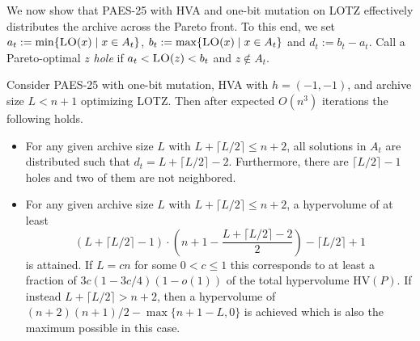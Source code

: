 \documentclass[
sigconf = false, %
review = false, %
screen = true, %
anonymous = true, %
format=acmsmall
]{acmart}
\newcommand{\hv}{\ensuremath{\mathrm{HV}}\xspace}
\newcommand{\LOTZ}{\textsc{LOTZ}\xspace}
\newcommand{\LO}{\textsc{LO}\xspace}                      %
\newcommand{\PAES}{PAES-25\xspace}
\begin{document}
We now show that \PAES with HVA and one-bit mutation on \LOTZ effectively distributes the archive across the Pareto front. To this end, we set $a_t:=\min\{\LO(x) \mid x \in A_t\}$, $b_t:=\max\{\LO(x) \mid x \in A_t\}$ and $d_t:=b_t-a_t$. Call a Pareto-optimal $z$ \emph{hole} if $a_t<\LO(z)<b_t$ and $z \notin A_t$.

\begin{lemma}
\label{lem:spreading-Pareto-front-1-Bit-Mutation-HVA}
Consider \PAES with one-bit mutation, HVA with $h=(-1,-1)$, and archive size $L < n+1$ optimizing \LOTZ. Then after expected $O(n^3)$ iterations the following holds.
\begin{itemize}
    \item[(1)] For any given archive size $L$ with $L+\lceil{L/2}\rceil \leq n+2$, all solutions in $A_t$ are distributed such that $d_t = L+\lceil{L/2}\rceil-2$. Furthermore, there are $\lceil{L/2}\rceil-1$ holes and two of them are not neighbored.
    \item[(2)] For any given archive size $L$ with $L+\lceil{L/2}\rceil \leq n+2$, a hypervolume of at least
    $$(L+\lceil{L/2}\rceil-1) \cdot \left(n+1-\frac{L+\lceil{L/2}\rceil-2}{2}\right) -\lceil{L/2}\rceil+1$$
    is attained. If $L=cn$ for some $0<c\leq 1$ this corresponds to at least a fraction of $3c(1-3c/4)(1 - o(1))$ of the total hypervolume $\hv(P)$. If instead $L+\lceil{L/2}\rceil > n+2$, then a hypervolume of $(n+2)(n+1)/2 - \max\{n+1-L,0\}$ is achieved which is also the maximum possible in this case. 
\end{itemize}
\end{lemma}
\end{document}
